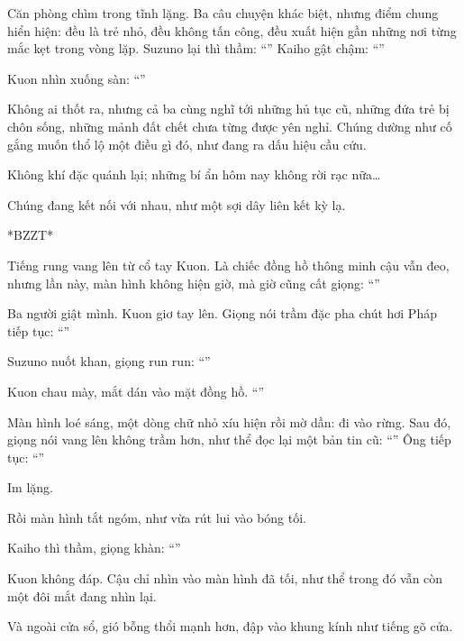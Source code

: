 \documentclass[../main.tex]{subfiles}
\begin{document}
Căn phòng chìm trong tĩnh lặng. Ba câu chuyện khác biệt, nhưng điểm chung hiển hiện: đều là trẻ nhỏ, đều không tấn công, đều xuất hiện gần những nơi từng mắc kẹt trong vòng lặp. Suzuno lại thì thầm: ``'' Kaiho gật chậm: ``''

Kuon nhìn xuống sàn: ``''

Không ai thốt ra, nhưng cả ba cùng nghĩ tới những hủ tục cũ, những đứa trẻ bị chôn sống, những mảnh đất chết chưa từng được yên nghỉ. Chúng dường như cố gắng muốn thổ lộ một điều gì đó, như đang ra dấu hiệu cầu cứu.

Không khí đặc quánh lại; những bí ẩn hôm nay không rời rạc nữa\dots

Chúng đang kết nối với nhau, như một sợi dây liên kết kỳ lạ.

*BZZT*

Tiếng rung vang lên từ cổ tay Kuon. Là chiếc đồng hồ thông minh cậu vẫn đeo, nhưng lần này, màn hình không hiện giờ, mà giờ cũng cất giọng: ``''

Ba người giật mình. Kuon giơ tay lên. Giọng nói trầm đặc pha chút hơi Pháp tiếp tục: ``''

Suzuno nuốt khan, giọng run run: ``''

Kuon chau mày, mắt dán vào mặt đồng hồ. ``''

Màn hình loé sáng, một dòng chữ nhỏ xíu hiện rồi mờ dần: đi vào rừng. Sau đó, giọng nói vang lên không trầm hơn, như thể đọc lại một bản tin cũ: ``'' Ông tiếp tục: ``''

Im lặng.

Rồi màn hình tắt ngóm, như vừa rút lui vào bóng tối.

Kaiho thì thầm, giọng khàn: ``''

Kuon không đáp. Cậu chỉ nhìn vào màn hình đã tối, như thể trong đó vẫn còn một đôi mắt đang nhìn lại.

Và ngoài cửa sổ, gió bỗng thổi mạnh hơn, đập vào khung kính như tiếng gõ cửa.
\end{document}

